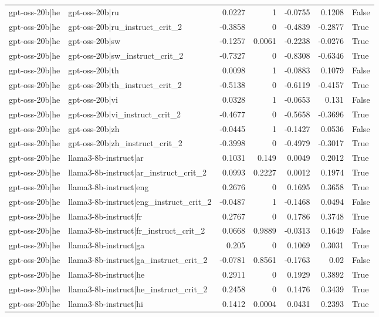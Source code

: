 \begin{table}
\begin{tabular}{l l r r r r l}
gpt-oss-20b|he & gpt-oss-20b|ru & 0.0227 & 1 & -0.0755 & 0.1208 & False \\
gpt-oss-20b|he & gpt-oss-20b|ru_instruct_crit_2 & -0.3858 & 0 & -0.4839 & -0.2877 & True \\
gpt-oss-20b|he & gpt-oss-20b|sw & -0.1257 & 0.0061 & -0.2238 & -0.0276 & True \\
gpt-oss-20b|he & gpt-oss-20b|sw_instruct_crit_2 & -0.7327 & 0 & -0.8308 & -0.6346 & True \\
gpt-oss-20b|he & gpt-oss-20b|th & 0.0098 & 1 & -0.0883 & 0.1079 & False \\
gpt-oss-20b|he & gpt-oss-20b|th_instruct_crit_2 & -0.5138 & 0 & -0.6119 & -0.4157 & True \\
gpt-oss-20b|he & gpt-oss-20b|vi & 0.0328 & 1 & -0.0653 & 0.131 & False \\
gpt-oss-20b|he & gpt-oss-20b|vi_instruct_crit_2 & -0.4677 & 0 & -0.5658 & -0.3696 & True \\
gpt-oss-20b|he & gpt-oss-20b|zh & -0.0445 & 1 & -0.1427 & 0.0536 & False \\
gpt-oss-20b|he & gpt-oss-20b|zh_instruct_crit_2 & -0.3998 & 0 & -0.4979 & -0.3017 & True \\
gpt-oss-20b|he & llama3-8b-instruct|ar & 0.1031 & 0.149 & 0.0049 & 0.2012 & True \\
gpt-oss-20b|he & llama3-8b-instruct|ar_instruct_crit_2 & 0.0993 & 0.2227 & 0.0012 & 0.1974 & True \\
gpt-oss-20b|he & llama3-8b-instruct|eng & 0.2676 & 0 & 0.1695 & 0.3658 & True \\
gpt-oss-20b|he & llama3-8b-instruct|eng_instruct_crit_2 & -0.0487 & 1 & -0.1468 & 0.0494 & False \\
gpt-oss-20b|he & llama3-8b-instruct|fr & 0.2767 & 0 & 0.1786 & 0.3748 & True \\
gpt-oss-20b|he & llama3-8b-instruct|fr_instruct_crit_2 & 0.0668 & 0.9889 & -0.0313 & 0.1649 & False \\
gpt-oss-20b|he & llama3-8b-instruct|ga & 0.205 & 0 & 0.1069 & 0.3031 & True \\
gpt-oss-20b|he & llama3-8b-instruct|ga_instruct_crit_2 & -0.0781 & 0.8561 & -0.1763 & 0.02 & False \\
gpt-oss-20b|he & llama3-8b-instruct|he & 0.2911 & 0 & 0.1929 & 0.3892 & True \\
gpt-oss-20b|he & llama3-8b-instruct|he_instruct_crit_2 & 0.2458 & 0 & 0.1476 & 0.3439 & True \\
gpt-oss-20b|he & llama3-8b-instruct|hi & 0.1412 & 0.0004 & 0.0431 & 0.2393 & True \\

\end{tabular}
\end{table}

